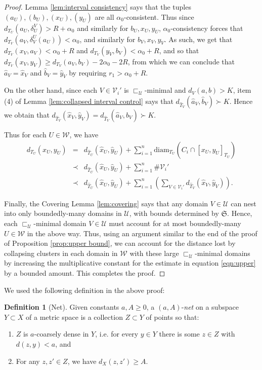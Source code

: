 \documentclass{amsart}
\theoremstyle{definition}
\newtheorem{definition}[theorem]{Definition}
\theoremstyle{remark}
\theoremstyle{definition}
\newcommand{\calU}{\mathcal{U}}
\newcommand{\calV}{\mathcal{V}}
\newcommand{\calW}{\mathcal{W}}
\newcommand{\hT}{\widehat{T}}
\newcommand{\hx}{\hat{x}}
\newcommand{\ha}{\hat{a}}
\newcommand{\hb}{\hat{b}}
\newcommand{\hy}{\hat{y}}
\newcommand{\diam}{\mathrm{diam}}
\newcommand{\nest}{\sqsubset}
\begin{document}
\begin{proof}
Lemma \ref{lem:interval consistency} says that the tuples $(a_U), (b_U), (x_U), (y_U)$ are all $\alpha_0$-consistent.  Thus since $d_{T_U}(a_U, \delta^V_U)>R + \alpha_0$ and similarly for $b_U,x_U,y_U$, $\alpha_0$-consistency forces that $d_{T_V}(a_V, \delta^U_V(a_U)) < \alpha_0$, and similarly for $b_V,x_V,y_V$.  As such, we get that $d_{T_V}(x_V,a_V) < \alpha_0 + R$ and $d_{T_V}(y_V,b_V) < \alpha_0 + R$, and so that $d_{T_V}(x_V,y_V) \geq d_{T_V}(a_V,b_V) - 2\alpha_0 - 2R$, from which we can conclude that $\ha_V = \hx_V$ and $\hb_V = \hy_V$ by requiring $r_1 > \alpha_0 + R$.




On the other hand, since each $V \in \calV_i'$ is $\nest_{\calU}$-minimal and $d_V(a,b) > K$, item (4) of Lemma \ref{lem:collapsed interval control} says that $d_{\hT_V}(\hat{a}_V,\hat{b}_V) \succ K$.  Hence we obtain that $d_{\hT_V}(\hx_V,\hy_V)  = d_{\hT_V}(\ha_V,\hb_V) \succ K$.

Thus for each $U \in \calW$, we have
\begin{eqnarray*}
d_{T_U}(x_U,y_U) & = & d_{\hT_U}(\hx_U,\hy_U) + \sum_{i=1}^n \diam_{T_U}(C_i \cap [x_U,y_U]_{T_U})\\
&\prec& d_{\hT_U}(\hx_U,\hy_U) + \sum_{i=1}^n \#\calV_i'\\
&\prec& d_{\hT_U}(\hx_U,\hy_U) + \sum_{i=1}^n \left(\sum_{V \in \calV_i'} d_{\hT_V}(\hx_V,\hy_V)\right).
\end{eqnarray*}

Finally, the Covering Lemma \ref{lem:covering} says that any domain $V \in \calU$ can nest into only boundedly-many domains in $\calU$, with bounds determined by $\mathfrak S$.  Hence, each $\nest_{\calU}$-minimal domain $V \in \calU$ must account for at most boundedly-many $U \in \calW$ in the above way.  Thus, using an argument similar to the end of the proof of Proposition \ref{prop:upper bound}, we can account for the distance lost by collapsing clusters in each domain in $\calW$ with these large $\nest_{\calU}$-minimal domains by increasing the multiplicative constant for the estimate in equation \eqref{eqn:upper} by a bounded amount.  This completes the proof.
\end{proof}

We used the following definition in the above proof:

\begin{definition}[Net]\label{defn:net}
Given constants $a,A\geq 0$, a $(a,A)$-\emph{net} on a subspace $Y \subset X$ of a metric space is a collection $Z \subset Y$ of points so that:
\begin{enumerate}
\item $Z$ is $a$-coarsely dense in $Y$, i.e. for every $y \in Y$ there is some $z \in Z$ with $d(z,y)<a$, and
\item For any $z,z' \in Z$, we have $d_X(z,z') \geq A$.
\end{enumerate}
\end{definition}
\end{document}
